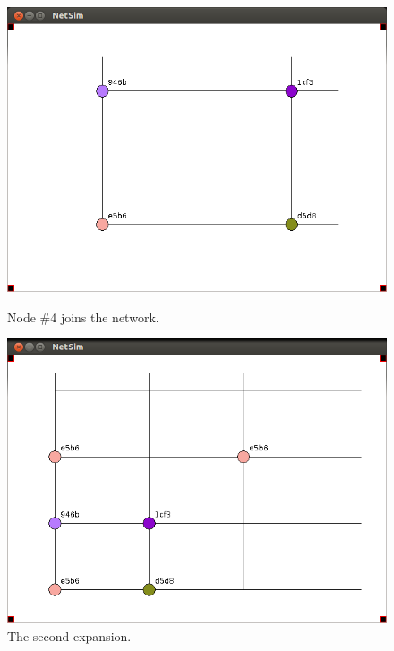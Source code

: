 \documentclass[ %
                    author={Luke Murray},
                supervisor={Dr. Simon Hollis},
                     title={Shadow Peer-to-Peer Networks},
                  subtitle={},
                    degree={MEng},
                      year={2013} ]{thesis}
\begin{document}
\begin{figure}[h]
    \centering
    \begin{minipage}[b]{0.45\linewidth}
        \centering
        \includegraphics[width=\linewidth]{sim_pics/expand_5.png}
        \caption{Node \#4 joins the network.}
        \label{sim_expand5}
    \end{minipage}
    \hspace{0.5cm}
    \begin{minipage}[b]{0.45\linewidth}
        \centering
        \includegraphics[width=\linewidth]{sim_pics/expand_6.png}
        \caption{The second expansion.}
        \label{sim_expand6}
    \end{minipage}
\end{figure}
\end{document}
